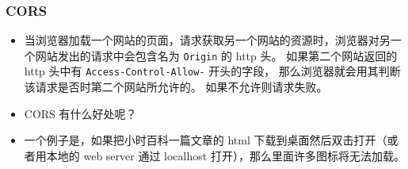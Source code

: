 \subsubsection{CORS}
\begin{itemize}
\item 当浏览器加载一个网站的页面，请求获取另一个网站的资源时，浏览器对另一个网站发出的请求中会包含名为 \verb`Origin` 的 http 头。 如果第二个网站返回的 http 头中有 \verb`Access-Control-Allow-` 开头的字段， 那么浏览器就会用其判断该请求是否时第二个网站所允许的。 如果不允许则请求失败。
\item CORS 有什么好处呢？ 
\item 一个例子是，如果把小时百科一篇文章的 html 下载到桌面然后双击打开（或者用本地的 web server 通过 localhost 打开），那么里面许多图标将无法加载。
\end{itemize}
 